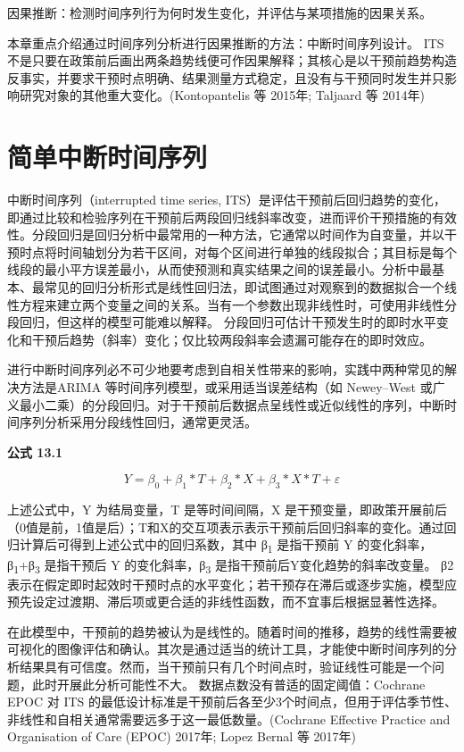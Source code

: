 \documentclass[
  chinese-hans,
  letterpaper,
  DIV=11,
  numbers=noendperiod]{scrreprt}
\begin{document}
因果推断：检测时间序列行为何时发生变化，并评估与某项措施的因果关系。

本章重点介绍通过时间序列分析进行因果推断的方法：中断时间序列设计。 ITS
不是只要在政策前后画出两条趋势线便可作因果解释；其核心是以干预前趋势构造反事实，并要求干预时点明确、结果测量方式稳定，且没有与干预同时发生并只影响研究对象的其他重大变化。(Kontopantelis
等 2015年; Taljaard 等 2014年)

\section{简单中断时间序列}\label{ux7b80ux5355ux4e2dux65adux65f6ux95f4ux5e8fux5217}

中断时间序列（interrupted time series,
ITS）是评估干预前后回归趋势的变化，即通过比较和检验序列在干预前后两段回归线斜率改变，进而评价干预措施的有效性。分段回归是回归分析中最常用的一种方法，它通常以时间作为自变量，并以干预时点将时间轴划分为若干区间，对每个区间进行单独的线段拟合；其目标是每个线段的最小平方误差最小，从而使预测和真实结果之间的误差最小。分析中最基本、最常见的回归分析形式是线性回归法，即试图通过对观察到的数据拟合一个线性方程来建立两个变量之间的关系。当有一个参数出现非线性时，可使用非线性分段回归，但这样的模型可能难以解释。
分段回归可估计干预发生时的即时水平变化和干预后趋势（斜率）变化；仅比较两段斜率会遗漏可能存在的即时效应。

进行中断时间序列必不可少地要考虑到自相关性带来的影响，实践中两种常见的解决方法是ARIMA
等时间序列模型，或采用适当误差结构（如 Newey--West
或广义最小二乘）的分段回归。对于干预前后数据点呈线性或近似线性的序列，中断时间序列分析采用分段线性回归，通常更灵活。

\textbf{公式 13.1}

\[Y = \beta_{0} + \beta_{1}*T + \beta_{2}*X + \beta_{3}*X*T + \varepsilon\]

上述公式中，Y 为结局变量，T 是等时间间隔，X
是干预变量，即政策开展前后（0值是前，1值是后）；T和X的交互项表示表示干预前后回归斜率的变化。通过回归计算后可得到上述公式中的回归系数，其中
β\textsubscript{1} 是指干预前 Y
的变化斜率，β\textsubscript{1}+β\textsubscript{3} 是指干预后 Y
的变化斜率，β\textsubscript{3} 是指干预前后Y变化趋势的斜率改变量。 β2
表示在假定即时起效时干预时点的水平变化；若干预存在滞后或逐步实施，模型应预先设定过渡期、滞后项或更合适的非线性函数，而不宜事后根据显著性选择。

在此模型中，干预前的趋势被认为是线性的。随着时间的推移，趋势的线性需要被可视化的图像评估和确认。其次是通过适当的统计工具，才能使中断时间序列的分析结果具有可信度。然而，当干预前只有几个时间点时，验证线性可能是一个问题，此时开展此分析可能性不大。
数据点数没有普适的固定阈值：Cochrane EPOC 对 ITS
的最低设计标准是干预前后各至少3个时间点，但用于评估季节性、非线性和自相关通常需要远多于这一最低数量。(Cochrane
Effective Practice and Organisation of Care (EPOC) 2017年; Lopez Bernal
等 2017年)
\end{document}
